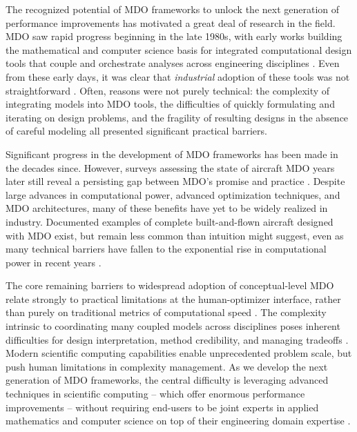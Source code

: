 The recognized potential of MDO frameworks to unlock the next generation of performance improvements has motivated a great deal of research in the field. MDO saw rapid progress beginning in the late 1980s, with early works building the mathematical and computer science basis for integrated computational design tools that couple and orchestrate analyses across engineering disciplines \cite{ashley_making_1982, vanderplaats_automated_1976, haftka_multidisciplinary_1997}. Even from these early days, it was clear that \emph{industrial} adoption of these tools was not straightforward \cite{kroo_multidisciplinary_1997, drela_pros_1998}. Often, reasons were not purely technical: the complexity of integrating models into MDO tools, the difficulties of quickly formulating and iterating on design problems, and the fragility of resulting designs in the absence of careful modeling all presented significant practical barriers.

Significant progress in the development of MDO frameworks has been made in the decades since. However, surveys assessing the state of aircraft MDO years later still reveal a persisting gap between MDO’s promise and practice \cite{agte_mdo_2010, drela_design_2011}. Despite large advances in computational power, advanced optimization techniques, and MDO architectures, many of these benefits have yet to be widely realized in industry. Documented examples of complete built-and-flown aircraft designed with MDO exist, but remain less common than intuition might suggest, even as many technical barriers have fallen to the exponential rise in computational power in recent years \cite{gazaix_industrialization_2017}.

The core remaining barriers to widespread adoption of conceptual-level MDO relate strongly to practical limitations at the human-optimizer interface, rather than purely on traditional metrics of computational speed \cite{gpkit}. The complexity intrinsic to coordinating many coupled models across disciplines poses inherent difficulties for design interpretation, method credibility, and managing tradeoffs \cite{salas_framework_1998}. Modern scientific computing capabilities enable unprecedented problem scale, but push human limitations in complexity management. As we develop the next generation of MDO frameworks, the central difficulty is leveraging advanced techniques in scientific computing -- which offer enormous performance improvements -- without requiring end-users to be joint experts in applied mathematics and computer science on top of their engineering domain expertise \cite{ma_modelingtoolkit_2021}.

